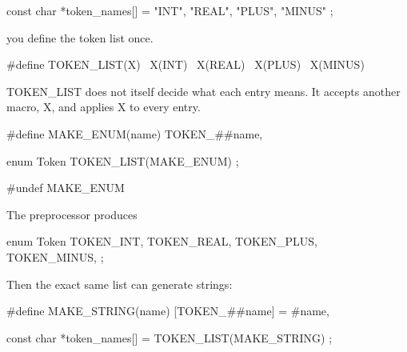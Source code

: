 \documentclass{report}
\begin{document}
\begin{itemize}
\begin{cppcode}
                    const char *token_names[] = {
                        "INT",
                        "REAL",
                        "PLUS",
                        "MINUS"
                    };
                \end{cppcode}
                \bigbreak \noindent 
                you define the token list once. 
                \bigbreak \noindent 
                \begin{cppcode}
                    #define TOKEN_LIST(X) \
                        X(INT)            \
                        X(REAL)           \
                        X(PLUS)           \
                        X(MINUS)
                \end{cppcode}
                \bigbreak \noindent 
                TOKEN\_LIST does not itself decide what each entry means. It accepts another macro, X, and applies X to every entry.
                \bigbreak \noindent 
                \begin{cppcode}
                    #define MAKE_ENUM(name) TOKEN_##name,

                    enum Token {
                        TOKEN_LIST(MAKE_ENUM)
                    };

                    #undef MAKE_ENUM
                \end{cppcode}
                \bigbreak \noindent 
                The preprocessor produces
                \bigbreak \noindent 
                \begin{cppcode}
                    enum Token {
                        TOKEN_INT,
                        TOKEN_REAL,
                        TOKEN_PLUS,
                        TOKEN_MINUS,
                    };
                \end{cppcode}
                \bigbreak \noindent 
                Then the exact same list can generate strings:
                \bigbreak \noindent 
                \begin{cppcode}
                    #define MAKE_STRING(name) [TOKEN_##name] = #name,

                    const char *token_names[] = {
                        TOKEN_LIST(MAKE_STRING)
                    };


\end{cppcode}
\end{itemize}
\end{document}
